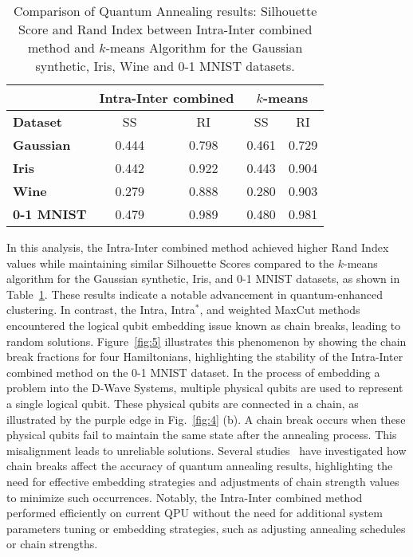 \documentclass[showpacs,twocolumn,superscriptaddress]{revtex4-2}
\begin{document}
\begin{table}[!ht]
\setlength{\tabcolsep}{8pt}
\centering
\begin{tabular}{lcccc}
\toprule
   & \multicolumn{2}{c}{\textbf{Intra-Inter combined}} & \multicolumn{2}{c}{\textbf{$k$-means}} \\ 
\midrule
\textbf{Dataset}   & SS    & RI    & SS    & RI    \\ \midrule
\textbf{Gaussian}  & 0.444 & 0.798 & 0.461 & 0.729 \\
\textbf{Iris}      & 0.442 & 0.922 & 0.443 & 0.904 \\
\textbf{Wine}      & 0.279 & 0.888 & 0.280 & 0.903 \\
\textbf{0-1 MNIST} & 0.479 & 0.989 & 0.480 & 0.981 \\ 
\bottomrule
\end{tabular}
\caption{Comparison of Quantum Annealing results: Silhouette Score and Rand Index between Intra-Inter combined method and $k$-means Algorithm for the Gaussian synthetic, Iris, Wine and 0-1 MNIST datasets.}
\label{tab:QA_comparison}
\end{table}

In this analysis, the Intra-Inter combined method achieved higher Rand Index values while maintaining similar Silhouette Scores compared to the $k$-means algorithm for the Gaussian synthetic, Iris, and 0-1 MNIST datasets, as shown in Table~\ref{tab:QA_comparison}. These results indicate a notable advancement in quantum-enhanced clustering.
In contrast, the Intra, Intra$^*$, and weighted MaxCut methods encountered the logical qubit embedding issue known as chain breaks, leading to random solutions. Figure~\ref{fig:5} illustrates this phenomenon by showing the chain break fractions for four Hamiltonians, highlighting the stability of the Intra-Inter combined method on the 0-1 MNIST dataset. In the process of embedding a problem into the D-Wave Systems, multiple physical qubits are used to represent a single logical qubit. These physical qubits are connected in a chain, as illustrated by the purple edge in Fig.~\ref{fig:4} (b). A chain break occurs when these physical qubits fail to maintain the same state after the annealing process. This misalignment leads to unreliable solutions. Several studies~\cite{hamerly2019experimental,grant2022benchmarking,le2023benchmarking,pelofske2023comparing,gilbert2024quantumannealerschainstrengths} have investigated how chain breaks affect the accuracy of quantum annealing results, highlighting the need for effective embedding strategies and adjustments of chain strength values to minimize such occurrences. Notably, the Intra-Inter combined method performed efficiently on current QPU without the need for additional system parameters tuning or embedding strategies, such as adjusting annealing schedules or chain strengths. 
\end{document}
